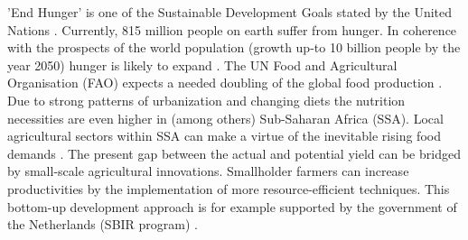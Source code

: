 

'End Hunger' is one of the Sustainable Development Goals stated by the United Nations \citep{UnitedNations2018}. Currently, 815 million people on earth suffer from hunger. In coherence with the prospects of the world population (growth up-to 10 billion people by the year 2050) hunger is likely to expand \citep{UnitedNations2018}. The UN Food and Agricultural Organisation (FAO) expects a needed doubling of the global food production \citep{FAO2018}. Due to strong patterns of urbanization and changing diets the nutrition necessities are even higher in (among others) Sub-Saharan Africa (SSA). Local agricultural sectors within SSA can make a virtue of the inevitable rising food demands \citep{MinistryofForeignAffairs2018}. The present gap between the actual and potential yield can be bridged by small-scale agricultural innovations. Smallholder farmers can increase productivities by the implementation of more resource-efficient techniques. This bottom-up development approach is for example supported by the government of the Netherlands (SBIR program) \citep{MinistryofForeignAffairs2018}. \\ 


